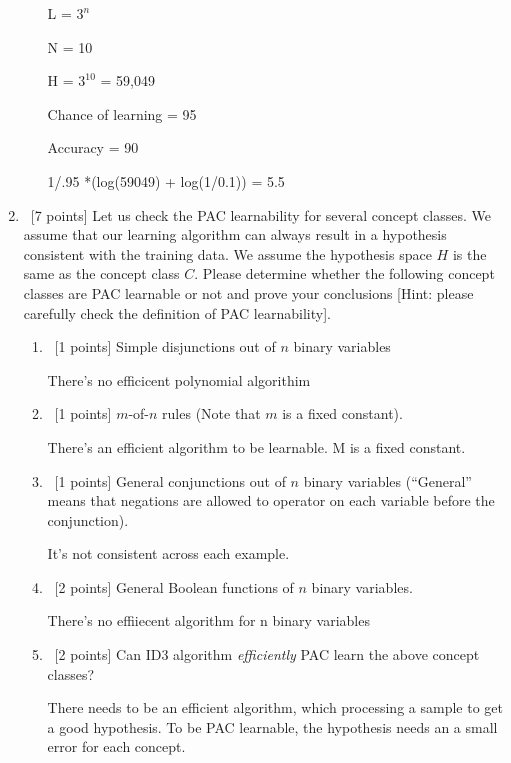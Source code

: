 \documentclass[12pt, fullpage,letterpaper]{article}
\begin{document}
\begin{enumerate}
\begin{enumerate}
L = $3^n$

N = 10

H = $3^10$ = 59,049

Chance of learning = 95%

Accuracy = 90%

1/.95 *(log(59049) + log(1/0.1)) = 5.5

\end{enumerate}

\item~[7 points] Let us check the PAC learnability for several concept classes. We assume that our learning algorithm can always result in a hypothesis consistent with the training data. We assume the hypothesis space $H$ is the same as the concept class $C$. Please determine whether the following concept classes are PAC learnable or not and prove your conclusions [Hint: please carefully check the definition of PAC learnability]. 
\begin{enumerate}
	\item~[1 points] Simple disjunctions out of $n$ binary variables \newline

There's no efficicent polynomial algorithim 

	\item~[1 points] $m$-of-$n$ rules (Note that $m$ is a fixed constant).   \newline

There's an efficient algorithm to be learnable. M is a fixed constant.

	\item~[1 points] General conjunctions out of $n$ binary variables (``General'' means that negations are allowed to operator on each variable before the conjunction). \newline

It's not consistent across each example.

	\item~[2 points] General Boolean functions of $n$ binary variables.  \newline

There's no effiiecent algorithm for n binary variables

	\item~[2 points] Can ID3 algorithm \textit{efficiently} PAC learn the above concept classes? \newline

There needs to be an efficient algorithm, which processing a sample to get a good hypothesis. To be PAC learnable, the hypothesis needs an a small error for each concept.


\end{enumerate}
\end{enumerate}
\end{document}
